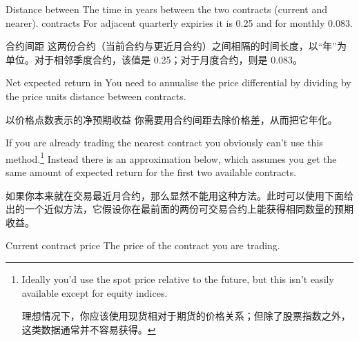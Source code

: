 \bipairgap

\begin{englishblock} Distance between The time in years between the two contracts (current and nearer). contracts For adjacent quarterly expiries it is 0.25 and for monthly 0.083. \end{englishblock}

\begin{chineseblock}合约间距 这两份合约（当前合约与更近月合约）之间相隔的时间长度，以“年”为单位。对于相邻季度合约，该值是 0.25；对于月度合约，则是 0.083。 \end{chineseblock}

\bipairgap

\begin{englishblock} Net expected return in You need to annualise the price differential by dividing by the price units distance between contracts. \end{englishblock}

\begin{chineseblock}以价格点数表示的净预期收益 你需要用合约间距去除价格差，从而把它年化。\end{chineseblock}

\bipairgap

\begin{englishblock} If you are already trading the nearest contract you obviously can't use this method.\footnote{Ideally you'd use the spot price relative to the future, but this isn't easily available except for equity indices. \par 理想情况下，你应该使用现货相对于期货的价格关系；但除了股票指数之外，这类数据通常并不容易获得。} Instead there is an approximation below, which assumes you get the same amount of expected return for the first two available contracts. \end{englishblock}

\begin{chineseblock}如果你本来就在交易最近月合约，那么显然不能用这种方法。此时可以使用下面给出的一个近似方法，它假设你在最前面的两份可交易合约上能获得相同数量的预期收益。\end{chineseblock}


\begin{englishblock} Current contract price The price of the contract you are trading. \end{englishblock}

